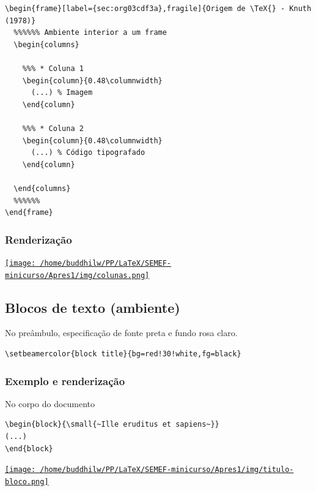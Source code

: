 \documentclass[11pt]{article}
\begin{document}
\begin{verbatim}
\begin{frame}[label={sec:org03cdf3a},fragile]{Origem de \TeX{} - Knuth (1978)}
  %%%%%% Ambiente interior a um frame
  \begin{columns}

    %%% * Coluna 1
    \begin{column}{0.48\columnwidth}
      (...) % Imagem
    \end{column}

    %%% * Coluna 2
    \begin{column}{0.48\columnwidth} 
      (...) % Código tipografado
    \end{column}

  \end{columns}
  %%%%%% 
\end{frame}
\end{verbatim}
\subsubsection{Renderização}
\label{sec:orgd6090ba}
\href{img/colunas.png}{\texttt{[image: /home/buddhilw/PP/LaTeX/SEMEF-minicurso/Apres1/img/colunas.png]}}

\subsection{Blocos de texto (ambiente)}
\label{sec:org77f3b4d}
No preâmbulo, especificação de fonte preta e fundo rosa claro.
\begin{verbatim}
\setbeamercolor{block title}{bg=red!30!white,fg=black}
\end{verbatim}

\subsubsection{Exemplo e renderização}
\label{sec:org4ce1153}
No corpo do documento
\begin{verbatim}
\begin{block}{\small{~Ille eruditus et sapiens~}}
(...)
\end{block}
\end{verbatim}

\href{img/titulo-bloco.png}{\texttt{[image: /home/buddhilw/PP/LaTeX/SEMEF-minicurso/Apres1/img/titulo-bloco.png]}}
\end{document}
